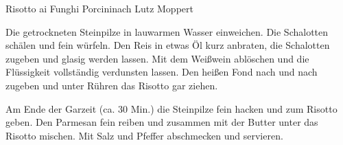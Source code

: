 \begin{recipe}{Risotto ai Funghi Porcini}{nach Lutz Moppert}\label{Risotto}
  \inglist

  \steps

  Die getrockneten Steinpilze in lauwarmen Wasser einweichen. Die Schalotten
  schälen und fein würfeln. Den Reis in etwas Öl kurz anbraten, die Schalotten
  zugeben und glasig werden lassen. Mit dem Weißwein ablöschen und die
  Flüssigkeit vollständig verdunsten lassen. Den heißen Fond nach und nach
  zugeben und unter Rühren das Risotto gar ziehen.

  Am Ende der Garzeit (ca. 30 Min.) die Steinpilze fein hacken und zum Risotto
  geben. Den Parmesan fein reiben und zusammen mit der Butter unter das Risotto
  mischen. Mit Salz und Pfeffer abschmecken und servieren.

\end{recipe}
